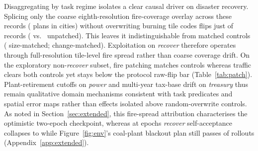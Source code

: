 Disaggregating by task regime isolates a clear causal driver on disaster recovery. \FireMechSentence{} \ifFireDone Splicing only the coarse eighth-resolution fire-coverage overlay across these \PcSymFireN{} records (\PcSymPlans{} plans in \PcSymCities{} cities) without overwriting burning tile codes flips just \PcFireOvK{} of \PcFireOvN{} records (\PcFireOv{} vs.\ \PcFireOvNone{} unpatched). This leaves it indistinguishable from matched controls (\PcFireOvSize{} \ci{\PcFireOvSizeCI} size-matched; \PcFireOvChg{} \ci{\PcFireOvChgCI} change-matched). Exploitation on \emph{recover} therefore operates through full-resolution tile-level fire spread rather than coarse coverage drift. \fi On the exploratory non-\emph{recover} subset, fire patching matches controls whereas traffic clears both controls yet stays below the protocol \MechLocalBar{} raw-flip bar (Table~\ref{tab:patch}). Plant-retirement cutoffs on \emph{power} and multi-year tax-base drift on \emph{treasury} thus remain qualitative domain mechanisms consistent with task predicates and spatial error maps rather than effects isolated above random-overwrite controls. As noted in Section~\ref{sec:extended}, this fire-spread attribution characterises the optimistic two-epoch checkpoint, whereas at \ExtTrEpochs{} epochs \emph{recover} self-acceptance collapses to \ExtTrRecovTenThouJudgeAcc{} while Figure~\ref{fig:env}'s coal-plant blackout plan still passes \ExtTrFigOnePass{} of \FigOneK{} rollouts (Appendix~\ref{app:extended}).
